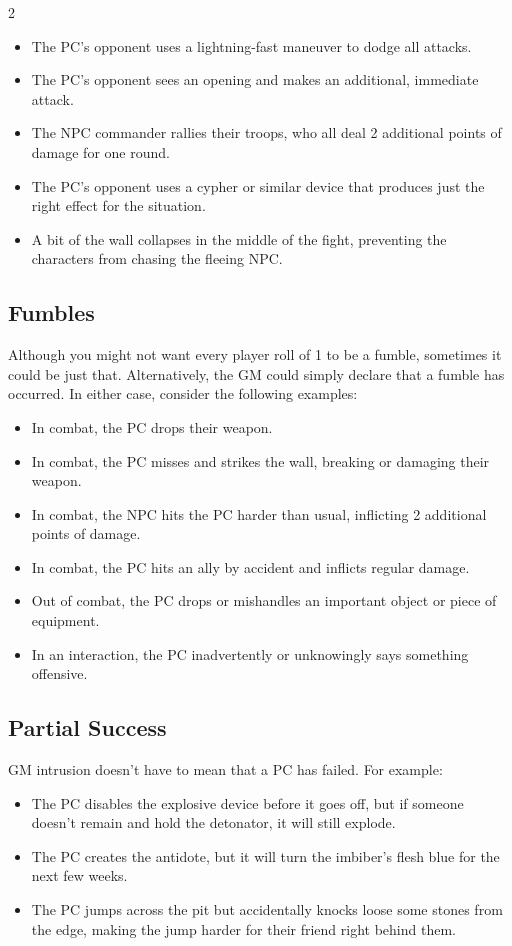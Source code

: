 \begin{multicols}{2}
\begin{itemize}
\item The PC’s opponent uses a lightning-fast maneuver to dodge all attacks.
\item The PC’s opponent sees an opening and makes an additional, immediate attack.
\item The NPC commander rallies their troops, who all deal 2 additional points of damage for one round.
\item The PC’s opponent uses a cypher or similar device that produces just the right effect for the situation.
\item A bit of the wall collapses in the middle of the fight, preventing the characters from chasing the fleeing NPC.
\end{itemize}

\subsection{Fumbles}

Although you might not want every player roll of 1 to be a fumble, sometimes it could be just that. Alternatively, the GM could simply declare that a fumble has occurred. In either case, consider the following examples:

\begin{itemize}
\item In combat, the PC drops their weapon.
\item In combat, the PC misses and strikes the wall, breaking or damaging their weapon.
\item In combat, the NPC hits the PC harder than usual, inflicting 2 additional points of damage.
\item In combat, the PC hits an ally by accident and inflicts regular damage.
\item Out of combat, the PC drops or mishandles an important object or piece of equipment.
\item In an interaction, the PC inadvertently or unknowingly says something offensive.
\end{itemize}

\subsection{Partial Success}
GM intrusion doesn’t have to mean that a PC has failed. For example:

\begin{itemize}
\item The PC disables the explosive device before it goes off, but if someone doesn’t remain and hold the detonator, it will still explode.
\item The PC creates the antidote, but it will turn the imbiber’s flesh blue for the next few weeks.
\item The PC jumps across the pit but accidentally knocks loose some stones from the edge, making the jump harder for their friend right behind them.
\end{itemize}


\end{multicols}
